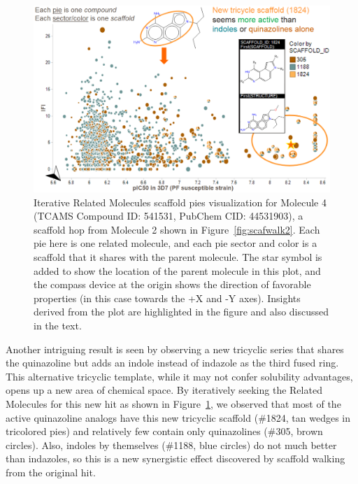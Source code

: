\documentclass[journal=jacsat,manuscript=article]{achemso}
\newcommand*\fref[1]{Figure~\ref{fig:#1}}
\begin{document}
\begin{figure}
\includegraphics[width=5.5in]{fig/mol3_RGtool_scafpie_iter.png}
\caption{Iterative Related Molecules scaffold pies visualization for Molecule 4 (TCAMS Compound ID: 541531, PubChem CID: 44531903), a scaffold hop from Molecule 2 shown in \fref{scafwalk2}. Each pie here is one related molecule, and each pie sector and color is a scaffold that it shares with the parent molecule. The star symbol is added to show the location of the parent molecule in this plot, and the compass device at the origin shows the direction of favorable properties (in this case towards the +X and -Y axes). Insights derived from the plot are highlighted in the figure and also discussed in the text.}
\label{fig:scafwalk3}
\end{figure}

Another intriguing result is seen by observing a new tricyclic series that shares the quinazoline but adds an indole instead of indazole as the third fused ring. This alternative tricyclic template, while it may not confer solubility advantages, opens up a new area of chemical space. By iteratively seeking the Related Molecules for this new hit as shown in \fref{scafwalk3}, we observed that most of the active quinazoline analogs have this new tricyclic scaffold (\#1824, tan wedges in tricolored pies) and relatively few contain only quinazolines (\#305, brown circles). Also, indoles by themselves (\#1188, blue circles) do not much better than indazoles, so this is a new synergistic effect discovered by scaffold walking from the original hit.            
\end{document}
